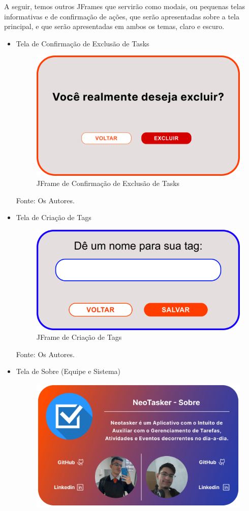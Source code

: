 \documentclass[a4paper,12pt]{article}
\begin{document}
\pagebreak
A seguir, temos outros JFrames que servirão como modais, ou pequenas telas informativas e de confirmação de ações, que serão apresentadas sobre a 
tela principal, e que serão apresentadas em ambos os temas, claro e escuro.
\begin{itemize}
	\item Tela de Confirmação de Exclusão de Tasks
	\begin{figure}[H]
		\centering
		\includegraphics[scale=0.20]{prototypes/white/Modal Confirmation.png}
		\caption{JFrame de Confirmação de Exclusão de Tasks}
	\end{figure}
	\noindent Fonte: Os Autores.
	\item Tela de Criação de Tags
	\begin{figure}[H]
		\centering
		\includegraphics[scale=0.20]{prototypes/white/Add Tag.png}
		\caption{JFrame de Criação de Tags}
	\end{figure}
	\noindent Fonte: Os Autores.
	\item Tela de Sobre (Equipe e Sistema)
	\begin{figure}[H]
		\centering
		\includegraphics[scale=0.20]{prototypes/white/About Us Panel Window.png}

\end{figure}
\end{itemize}
\end{document}
